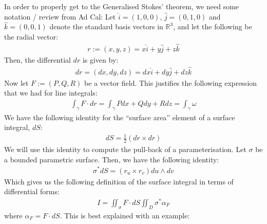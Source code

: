 \documentclass[11pt]{scrartcl}
\newcommand{\R}[0]{\mathbb{R}}
\theoremstyle{definition}
\theoremstyle{remark}
\newcommand{\idx}[2]{\int_{#1}^{#2}}
\begin{document}
{In order to properly get to the Generalised Stokes' theorem, we need some notation / review from Ad Cal: Let $\hat{i} = (1,0,0)$, $\hat{j} = (0,1,0)$ and $\hat{k} = (0,0,1)$ denote the standard basis vectors in $\R^3$, and let the following be the radial vector: 
\begin{align*}
	r  := (x,y,z)  = x \hat{i} + y \hat{j} + z \hat{k} 
\end{align*}
Then, the differential $dr$ is given by: 
\begin{align}
	dr = (dx, dy , dz) = dx \hat{i} + dy \hat{j} + dz \hat{k} 	
\end{align}
Now let $F := (P,Q,R)$ be a vector field. This justifies the following expression that we had for line integrals:
\begin{align*}
	\idx{\gamma}{} F \cdot dr = \idx{\gamma}{} P dx + Q dy + R dz = \idx{\gamma}{} \omega 
\end{align*}
We have the following identity for the ``surface area'' element of a surface integral, $dS$: 
\begin{align}
	dS = \frac{1}{2} (dr \times dr) 	
\end{align}
We will use this identity to compute the pull-back of a parameterisation. Let $\sigma$ be a bounded parametric surface. Then, we have the following identity: 
\begin{align} 
	\sigma^* dS = (r_u \times r_v) du \wedge dv 
\end{align} 
Which gives us the following definition of the surface integral in terms of differential forms: 
\begin{align}
	I = \iint_\sigma F \cdot dS \iint_D \sigma^* \alpha_F 	
\end{align}
where $\alpha_F = F \cdot dS$. This is best explained with an example: 

}
\end{document}
